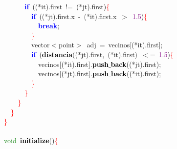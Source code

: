 \documentclass[10pt,a4paper,twoside]{article}
\begin{document}
{{{{{\mbox{}\ \ \ \ \ \ \ \ \textbf{\textcolor{Blue}{if}}\ \textcolor{BrickRed}{((*}it\textcolor{BrickRed}{).}first\ \textcolor{BrickRed}{!=}\ \textcolor{BrickRed}{(*}jt\textcolor{BrickRed}{).}first\textcolor{BrickRed}{)}\textcolor{Red}{\{} \\
\mbox{}\ \ \ \ \ \ \ \ \ \ \textbf{\textcolor{Blue}{if}}\ \textcolor{BrickRed}{((*}jt\textcolor{BrickRed}{).}first\textcolor{BrickRed}{.}x\ \textcolor{BrickRed}{-}\ \textcolor{BrickRed}{(*}it\textcolor{BrickRed}{).}first\textcolor{BrickRed}{.}x\ \textcolor{BrickRed}{$>$}\ \textcolor{Purple}{1.5}\textcolor{BrickRed}{)}\textcolor{Red}{\{} \\
\mbox{}\ \ \ \ \ \ \ \ \ \ \ \ \textbf{\textcolor{Blue}{break}}\textcolor{BrickRed}{;} \\
\mbox{}\ \ \ \ \ \ \ \ \ \ \textcolor{Red}{\}} \\
\mbox{}\ \ \ \ \ \ \ \ \ \ vector\textcolor{BrickRed}{$<$}point\textcolor{BrickRed}{$>$}\ adj\ \textcolor{BrickRed}{=}\ vecinos\textcolor{BrickRed}{[(*}it\textcolor{BrickRed}{).}first\textcolor{BrickRed}{];} \\
\mbox{}\ \ \ \ \ \ \ \ \ \ \textbf{\textcolor{Blue}{if}}\ \textcolor{BrickRed}{(}\textbf{\textcolor{Black}{distancia}}\textcolor{BrickRed}{((*}jt\textcolor{BrickRed}{).}first\textcolor{BrickRed}{,}\ \textcolor{BrickRed}{(*}it\textcolor{BrickRed}{).}first\textcolor{BrickRed}{)}\ \textcolor{BrickRed}{$<$=}\ \textcolor{Purple}{1.5}\textcolor{BrickRed}{)}\textcolor{Red}{\{} \\
\mbox{}\ \ \ \ \ \ \ \ \ \ \ \ vecinos\textcolor{BrickRed}{[(*}it\textcolor{BrickRed}{).}first\textcolor{BrickRed}{].}\textbf{\textcolor{Black}{push$\_$back}}\textcolor{BrickRed}{((*}jt\textcolor{BrickRed}{).}first\textcolor{BrickRed}{);} \\
\mbox{}\ \ \ \ \ \ \ \ \ \ \ \ vecinos\textcolor{BrickRed}{[(*}jt\textcolor{BrickRed}{).}first\textcolor{BrickRed}{].}\textbf{\textcolor{Black}{push$\_$back}}\textcolor{BrickRed}{((*}it\textcolor{BrickRed}{).}first\textcolor{BrickRed}{);} \\
\mbox{}\ \ \ \ \ \ \ \ \ \ \textcolor{Red}{\}} \\
\mbox{}\ \ \ \ \ \ \ \ \textcolor{Red}{\}} \\
\mbox{}\ \ \ \ \ \ \textcolor{Red}{\}} \\
\mbox{}\ \ \ \ \textcolor{Red}{\}} \\
\mbox{}\ \ \textcolor{Red}{\}} \\
\mbox{}\ \  \\
\mbox{}\ \ \textcolor{ForestGreen}{void}\ \textbf{\textcolor{Black}{initialize}}\textcolor{BrickRed}{()}\textcolor{Red}{\{} \\
}}}}}
\end{document}

